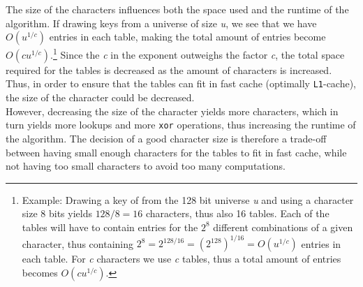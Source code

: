 \documentclass[11pt]{article} %
\begin{document}
The size of the characters influences both the space used and the runtime of the algorithm. If drawing keys from a universe of size \emph{u}, we see that we have $O(u^{1/c})$ entries in each table, making the total amount of entries become $O(cu^{1/c})$.\footnote{Example: Drawing a key of from the 128 bit universe \emph{u} and using a character size 8 bits yields $128/8=16$ characters, thus also 16 tables. Each of the tables will have to contain entries for the $2^8$ different combinations of a given character, thus containing $2^8 = 2^{128/16} = (2^{128})^{1/16} = O(u^{1/c})$ entries in each table. For \emph{c} characters we use \emph{c} tables, thus a total amount of entries becomes $O(cu^{1/c})$.} Since the \emph{c} in the exponent outweighs the factor \emph{c}, the total space required for the tables is decreased as the amount of characters is increased. Thus, in order to ensure that the tables can fit in fast cache (optimally \verb|L1|-cache), the size of the character could be decreased. \\

However, decreasing the size of the character yields more characters, which in turn yields more lookups and more \verb|xor| operations, thus increasing the runtime of the algorithm. The decision of a good character size is therefore a trade-off between having small enough characters for the tables to fit in fast cache, while not having too small characters to avoid too many computations.\\
\end{document}
